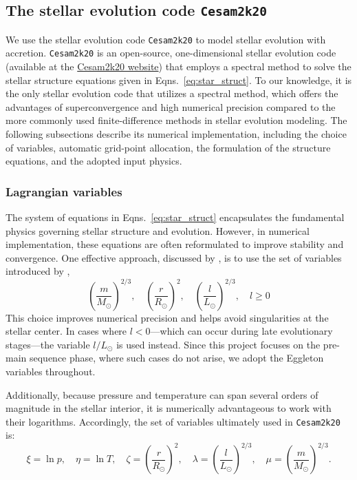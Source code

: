 \documentclass[12pt,a4paper]{article}
\begin{document}
\subsection{The stellar evolution code \texttt{Cesam2k20}}
\label{sec:cesam2k20}

We use the stellar evolution code \texttt{Cesam2k20} \parencite{MarquesEtAl2013,MorelLebreton2008,Morel1997} to model stellar evolution with accretion. \texttt{Cesam2k20} is an open-source, one-dimensional stellar evolution code (available at the \href{https://www.ias.u-psud.fr/cesam2k20/home.html}{Cesam2k20 website}) that employs a spectral method to solve the stellar structure equations given in Eqns.~\eqref{eq:star_struct}. To our knowledge, it is the only stellar evolution code that utilizes a spectral method, which offers the advantages of superconvergence and high numerical precision compared to the more commonly used finite-difference methods in stellar evolution modeling. The following subsections describe its numerical implementation, including the choice of variables, automatic grid-point allocation, the formulation of the structure equations, and the adopted input physics.

\subsubsection{Lagrangian variables}
\label{sec:cesam2k20_variables}

The system of equations in Eqns.~\eqref{eq:star_struct} encapsulates the fundamental physics governing stellar structure and evolution. However, in numerical implementation, these equations are often reformulated to improve stability and convergence. One effective approach, discussed by \textcite{Morel1997}, is to use the set of variables introduced by \textcite{Eggleton1971},
\begin{equation*}
  \left(\frac{m}{M_\odot}\right)^{2/3},\quad \left(\frac{r}{R_\odot}\right)^2,\quad \left(\frac{l}{L_\odot}\right)^{2/3}, \quad l \geq 0
\end{equation*}
This choice improves numerical precision and helps avoid singularities at the stellar center. In cases where $l < 0$—which can occur during late evolutionary stages—the variable $l/L_\odot$ is used instead. Since this project focuses on the pre-main sequence phase, where such cases do not arise, we adopt the Eggleton variables throughout.

Additionally, because pressure and temperature can span several orders of magnitude in the stellar interior, it is numerically advantageous to work with their logarithms. Accordingly, the set of variables ultimately used in \texttt{Cesam2k20} is:
\begin{equation}
  \xi = \ln p,\quad \eta = \ln T,\quad \zeta = \left(\frac{r}{R_\odot}\right)^2,\quad \lambda = \left(\frac{l}{L_\odot}\right)^{2/3},\quad \mu = \left(\frac{m}{M_\odot}\right)^{2/3}. \label{eq:cesam2k20_variables}
\end{equation}
\end{document}
